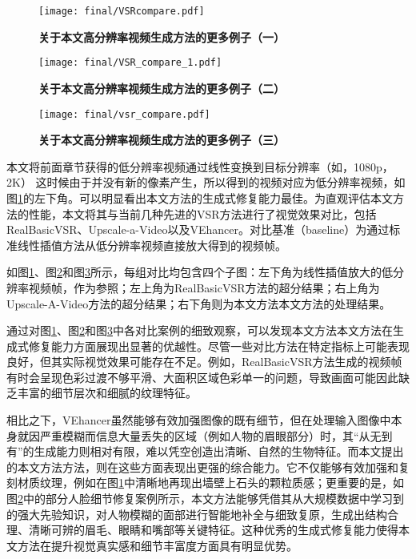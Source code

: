 \begin{figure}[h]
    \centering
    \texttt{[image: final/VSRcompare.pdf]}
    \caption{\textbf{关于本文高分辨率视频生成方法的更多例子（一）}}
    \label{fig:vsr2}
\end{figure}

\begin{figure}[h]
    \centering
    \texttt{[image: final/VSR\_compare\_1.pdf]}
    \caption{\textbf{关于本文高分辨率视频生成方法的更多例子（二）}}
    \label{fig:vsr3}
\end{figure}

\begin{figure}[h]
    \centering
    \texttt{[image: final/vsr\_compare.pdf]}
    \caption{\textbf{关于本文高分辨率视频生成方法的更多例子（三）}}
    \label{fig:vsr1}
\end{figure}

本文将前面章节获得的低分辨率视频通过线性变换到目标分辨率（如，1080p， 2K） 这时候由于并没有新的像素产生，所以得到的视频对应为低分辨率视频，如图\ref{fig:vsr2}的左下角。可以明显看出本文方法的生成式修复能力最佳。为直观评估本文方法的性能，本文将其与当前几种先进的VSR方法进行了视觉效果对比，包括RealBasicVSR\cite{RealBasicVSR}、Upscale-a-Video\cite{zhou2024upscaleavideo}以及VEhancer\cite{he2024venhancer}。对比基准（baseline）为通过标准线性插值方法从低分辨率视频直接放大得到的视频帧。

如图\ref{fig:vsr2}、图\ref{fig:vsr3}和图\ref{fig:vsr1}所示，每组对比均包含四个子图：左下角为线性插值放大的低分辨率视频帧，作为参照；左上角为RealBasicVSR方法的超分结果；右上角为Upscale-A-Video方法的超分结果；右下角则为本文方法本文方法的处理结果。


通过对图\ref{fig:vsr2}、图\ref{fig:vsr3}和图\ref{fig:vsr1}中各对比案例的细致观察，可以发现本文方法本文方法在生成式修复能力方面展现出显著的优越性。尽管一些对比方法在特定指标上可能表现良好，但其实际视觉效果可能存在不足。例如，RealBasicVSR\cite{RealBasicVSR}方法生成的视频帧有时会呈现色彩过渡不够平滑、大面积区域色彩单一的问题，导致画面可能因此缺乏丰富的细节层次和细腻的纹理特征。

相比之下，VEhancer\cite{he2024venhancer}虽然能够有效加强图像的既有细节，但在处理输入图像中本身就因严重模糊而信息大量丢失的区域（例如人物的眉眼部分）时，其“从无到有”的生成能力则相对有限，难以凭空创造出清晰、自然的生物特征。而本文提出的本文方法方法，则在这些方面表现出更强的综合能力。它不仅能够有效加强和复刻材质纹理，例如在图\ref{fig:vsr2}中清晰地再现出墙壁上石头的颗粒质感；更重要的是，如图\ref{fig:vsr3}中的部分人脸细节修复案例所示，本文方法能够凭借其从大规模数据中学习到的强大先验知识，对人物模糊的面部进行智能地补全与细致复原，生成出结构合理、清晰可辨的眉毛、眼睛和嘴部等关键特征。这种优秀的生成式修复能力使得本文方法在提升视觉真实感和细节丰富度方面具有明显优势。

